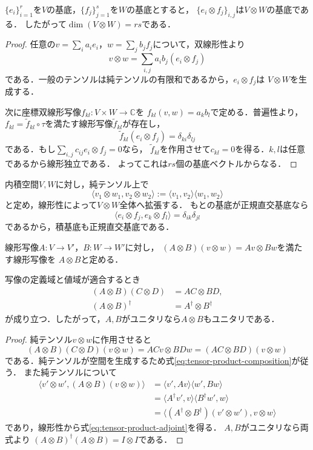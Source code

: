 \begin{prop}
$\{e_i\}_{i=1}^{r}$を$V$の基底，$\{f_j\}_{j=1}^{s}$を$W$の基底とすると，
$\{e_i\otimes f_j\}_{i,j}$は$V\otimes W$の基底である．
したがって$\dim(V\otimes W)=rs$である．
\end{prop}
\begin{proof}
任意の$v=\sum_i a_ie_i$，$w=\sum_jb_jf_j$について，双線形性より
\[
  v\otimes w=\sum_{i,j}a_ib_j(e_i\otimes f_j)
\]
である．一般のテンソルは純テンソルの有限和であるから，$e_i\otimes f_j$は
$V\otimes W$を生成する．

次に座標双線形写像$f_{kl}:V\times W\to\mathbb C$を
$f_{kl}(v,w)=a_kb_l$で定める．普遍性より，
$f_{kl}=\widetilde f_{kl}\circ\tau$を満たす線形写像$\widetilde f_{kl}$が存在し，
\[
  \widetilde f_{kl}(e_i\otimes f_j)=\delta_{ki}\delta_{lj}
\]
である．もし$\sum_{i,j}c_{ij}e_i\otimes f_j=0$なら，
$\widetilde f_{kl}$を作用させて$c_{kl}=0$を得る．$k,l$は任意であるから線形独立である．
よってこれは$rs$個の基底ベクトルからなる．
\end{proof}

内積空間$V,W$に対し，純テンソル上で
\begin{equation}
  \langle v_1\otimes w_1,v_2\otimes w_2\rangle
  :=\langle v_1,v_2\rangle\langle w_1,w_2\rangle
  \label{eq:tensor-inner-product}
\end{equation}
と定め，線形性によって$V\otimes W$全体へ拡張する．
もとの基底が正規直交基底なら
\[
 \langle e_i\otimes f_j,e_k\otimes f_l\rangle
 =\delta_{ik}\delta_{jl}
\]
であるから，積基底も正規直交基底である．

\begin{defi}[線形写像のテンソル積]
線形写像$A:V\to V'$，$B:W\to W'$に対し，
$(A\otimes B)(v\otimes w)=Av\otimes Bw$を満たす線形写像を
$A\otimes B$と定める．
\end{defi}

\begin{prop}
写像の定義域と値域が適合するとき
\begin{align}
 (A\otimes B)(C\otimes D)&=AC\otimes BD,\label{eq:tensor-product-composition}\\
 (A\otimes B)^\dagger&=A^\dagger\otimes B^\dagger
 \label{eq:tensor-product-adjoint}
\end{align}
が成り立つ．したがって，$A,B$がユニタリなら$A\otimes B$もユニタリである．
\end{prop}
\begin{proof}
純テンソル$v\otimes w$に作用させると
\[
 (A\otimes B)(C\otimes D)(v\otimes w)
 =ACv\otimes BDw=(AC\otimes BD)(v\otimes w)
\]
である．純テンソルが空間を生成するため式\eqref{eq:tensor-product-composition}が従う．
また純テンソルについて
\begin{align*}
 \langle v'\otimes w',(A\otimes B)(v\otimes w)\rangle
 &=\langle v',Av\rangle\langle w',Bw\rangle\\
 &=\langle A^\dagger v',v\rangle\langle B^\dagger w',w\rangle\\
 &=\langle(A^\dagger\otimes B^\dagger)(v'\otimes w'),v\otimes w\rangle
\end{align*}
であり，線形性から式\eqref{eq:tensor-product-adjoint}を得る．
$A,B$がユニタリなら両式より
$(A\otimes B)^\dagger(A\otimes B)=I\otimes I$である．
\end{proof}


